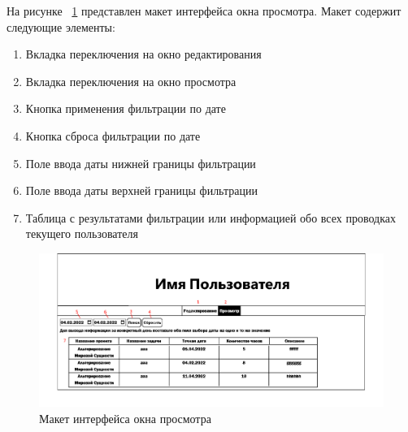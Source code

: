 На рисунке ~\ref{fig:inter2} представлен макет интерфейса окна просмотра. Макет содержит следующие элементы:
\begin{enumerate}
	\item Вкладка переключения на окно редактирования
	\item Вкладка переключения на окно просмотра
	\item Кнопка применения фильтрации по дате
	\item Кнопка сброса фильтрации по дате
	\item Поле ввода даты нижней границы фильтрации
	\item Поле ввода даты верхней границы фильтрации
	\item Таблица с результатами фильтрации или информацией обо всех проводках текущего пользователя
\end{enumerate}

\begin{figure}[H]
	\centering
	\includegraphics[width=1\linewidth]{images/inter2}
	\caption{Макет интерфейса окна просмотра}
	\label{fig:inter2}
\end{figure}